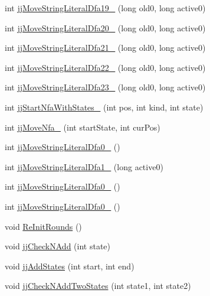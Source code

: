 \begin{DoxyCompactItemize}
int \hyperlink{classorg_1_1coode_1_1owl_1_1krssparser_1_1_k_r_s_s_parser_token_manager_acd3ea9ee6389109e044a99865b3321fd}{jj\-Move\-String\-Literal\-Dfa19\-\_} (long old0, long active0)
\item 
int \hyperlink{classorg_1_1coode_1_1owl_1_1krssparser_1_1_k_r_s_s_parser_token_manager_ac424fe4bdd265817ef3831050c23ad72}{jj\-Move\-String\-Literal\-Dfa20\-\_} (long old0, long active0)
\item 
int \hyperlink{classorg_1_1coode_1_1owl_1_1krssparser_1_1_k_r_s_s_parser_token_manager_a850f17ce1022f3a31dc7ef53a2e09977}{jj\-Move\-String\-Literal\-Dfa21\-\_} (long old0, long active0)
\item 
int \hyperlink{classorg_1_1coode_1_1owl_1_1krssparser_1_1_k_r_s_s_parser_token_manager_ad43a53e8367292feda51b50c3a2bc7ed}{jj\-Move\-String\-Literal\-Dfa22\-\_} (long old0, long active0)
\item 
int \hyperlink{classorg_1_1coode_1_1owl_1_1krssparser_1_1_k_r_s_s_parser_token_manager_a890a65e92442c7dc5ecdfbd8a618351e}{jj\-Move\-String\-Literal\-Dfa23\-\_} (long old0, long active0)
\item 
int \hyperlink{classorg_1_1coode_1_1owl_1_1krssparser_1_1_k_r_s_s_parser_token_manager_afe475f5ad943674cfc3f20cc0548bc39}{jj\-Start\-Nfa\-With\-States\-\_} (int pos, int kind, int state)
\item 
int \hyperlink{classorg_1_1coode_1_1owl_1_1krssparser_1_1_k_r_s_s_parser_token_manager_a7e0190ce41a711d9477d7dd63280904c}{jj\-Move\-Nfa\-\_} (int start\-State, int cur\-Pos)
\item 
int \hyperlink{classorg_1_1coode_1_1owl_1_1krssparser_1_1_k_r_s_s_parser_token_manager_a157882dbaf923405f69ddf0c62afd1b7}{jj\-Move\-String\-Literal\-Dfa0\-\_} ()
\item 
int \hyperlink{classorg_1_1coode_1_1owl_1_1krssparser_1_1_k_r_s_s_parser_token_manager_a51354e431e575973485ac48b5688d85b}{jj\-Move\-String\-Literal\-Dfa1\-\_} (long active0)
\item 
int \hyperlink{classorg_1_1coode_1_1owl_1_1krssparser_1_1_k_r_s_s_parser_token_manager_a8d3044bc3117afc5845691282c3359ba}{jj\-Move\-String\-Literal\-Dfa0\-\_} ()
\item 
int \hyperlink{classorg_1_1coode_1_1owl_1_1krssparser_1_1_k_r_s_s_parser_token_manager_acecd26237886076cebd622778b4d1beb}{jj\-Move\-String\-Literal\-Dfa0\-\_} ()
\item 
void \hyperlink{classorg_1_1coode_1_1owl_1_1krssparser_1_1_k_r_s_s_parser_token_manager_ac28f411209f6a0f8561dfb8ed988ffdd}{Re\-Init\-Rounds} ()
\item 
void \hyperlink{classorg_1_1coode_1_1owl_1_1krssparser_1_1_k_r_s_s_parser_token_manager_a48b8bd45754364f69cba40711defae7b}{jj\-Check\-N\-Add} (int state)
\item 
void \hyperlink{classorg_1_1coode_1_1owl_1_1krssparser_1_1_k_r_s_s_parser_token_manager_ae5b3ea701c0f7776d7d7c9edddeb336e}{jj\-Add\-States} (int start, int end)
\item 
void \hyperlink{classorg_1_1coode_1_1owl_1_1krssparser_1_1_k_r_s_s_parser_token_manager_afe4c09eb3f0b00ce2379ad05d7c0d6d2}{jj\-Check\-N\-Add\-Two\-States} (int state1, int state2)
\end{DoxyCompactItemize}
